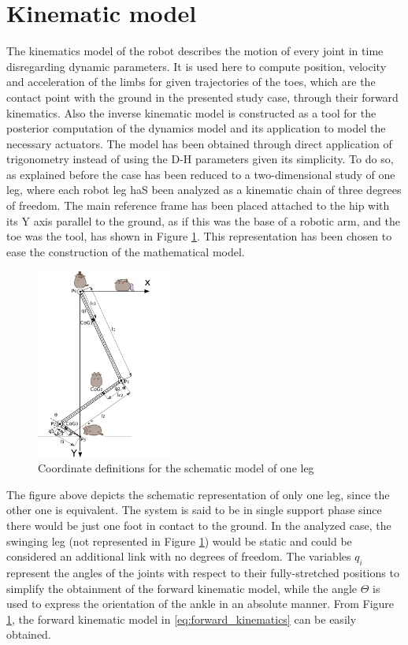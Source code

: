 
\section{Kinematic model}
\label{sec_kinematic_model}
The kinematics model of the robot describes the motion of every joint in time disregarding dynamic parameters.
It is used here to compute position, velocity and acceleration of the limbs for given trajectories of the toes, which are the contact point with the ground in the presented study case, through their forward kinematics.
Also the inverse kinematic model is constructed as a tool for the posterior computation of the dynamics model and its application to model the necessary actuators.
The model has been obtained through direct application of trigonometry instead of using the D-H parameters given its simplicity.
To do so, as explained before the case has been reduced to a two-dimensional study of one leg, where each robot leg haS been analyzed as a kinematic chain of three degrees of freedom.
The main reference frame has been placed attached to the hip with its Y axis parallel to the ground, as if this was the base of a robotic arm, and the toe was the tool, has shown in Figure \ref{fig:kinematics}.
This representation has been chosen to ease the construction of the mathematical model.

\begin{figure}[ht]
	\centering
	\includegraphics[width=0.4\textwidth]{figures/kinematics_model_kitties.pdf}
	\caption{Coordinate definitions for the schematic model of one leg}
	\label{fig:kinematics}
\end{figure}

The figure above depicts the schematic representation of only one leg, since the other one is equivalent. 
The system is said to be in single support phase since there would be just one foot in contact to the ground.
In the analyzed case, the swinging leg (not represented in Figure \ref{fig:kinematics}) would be static and could be considered an additional link with no degrees of freedom.
The variables $q_{i}$ represent the angles of the joints with respect to their fully-stretched positions to simplify the obtainment of the forward kinematic model, while the angle $\Theta$ is used to express the orientation of the ankle in an absolute manner. 
From Figure \ref{fig:kinematics}, the forward kinematic model in \ref{eq:forward_kinematics} can be easily obtained.


